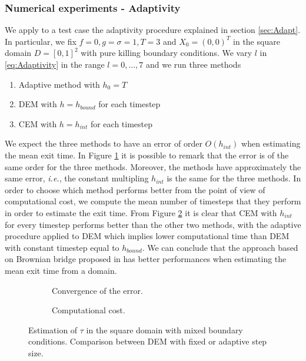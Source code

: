 \subsubsection{Numerical experiments - Adaptivity}
We apply to a test case the adaptivity procedure explained in section \ref{sec:Adapt}. In particular, we fix $f = 0, g = \sigma = 1, T = 3$ and $X_0 = (0,0)^T$ in the square domain $D = \left[0,1\right]^2$ with pure killing boundary conditions. We vary $l$ in \eqref{eq:Adaptivity} in the range $l = 0, \dots, 7$ and we run three methods
\begin{enumerate}
	\item Adaptive method with $h_0 = T$
	\item DEM with $h = h_{bound}$ for each timestep
	\item CEM with $h = h_{int}$ for each timestep
\end{enumerate}
We expect the three methods to have an error of order $O(h_{int})$ when estimating the mean exit time. In Figure \ref{fig:AdaptErr} it is possible to remark that the error is of the same order for the three methods. Moreover, the methods have approximately the same error, \textit{i.e.}, the constant multipling $h_{int}$ is the same for the three methods. In order to choose which method performs better from the point of view of computational cost, we compute the mean number of timesteps that they perform in order to estimate the exit time. From Figure \ref{fig:AdaptCost} it is clear that CEM with $h_{int}$ for every timestep performs better than the other two methods, with the adaptive procedure applied to DEM which implies lower computational time than DEM with constant timestep equal to $h_{bound}$. We can conclude that the approach based on Brownian bridge proposed in \cite{Gobet2001} has better performances when estimating the mean exit time from a domain.

\begin{figure}[t]
    \centering
    \begin{subfigure}{0.49\linewidth}
        \centering
        \resizebox{1\linewidth}{!}{ }  
        \caption{Convergence of the error.}
        \label{fig:AdaptErr}
    \end{subfigure}
    \begin{subfigure}{0.49\linewidth}
        \centering
        \resizebox{1\linewidth}{!}{ }  
        \caption{Computational cost.}
        \label{fig:AdaptCost}
    \end{subfigure}    
    \caption{Estimation of $\tau$ in the square domain with mixed boundary conditions. Comparison between DEM with fixed or adaptive step size.}
    \label{fig:AdaptResults}
\end{figure}

